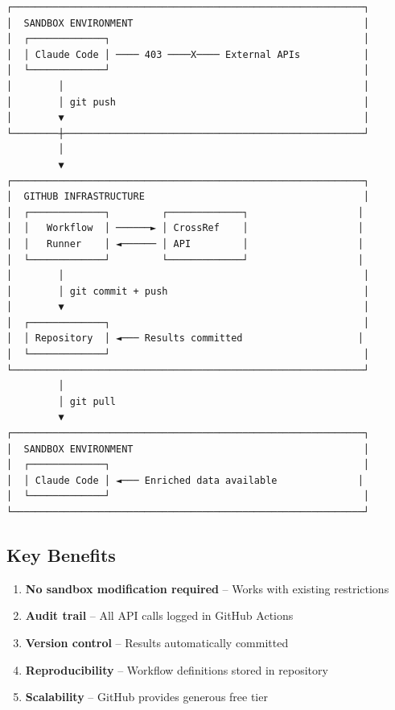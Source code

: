 \begin{verbatim}
┌─────────────────────────────────────────────────────────────┐
│  SANDBOX ENVIRONMENT                                        │
│  ┌─────────────┐                                            │
│  │ Claude Code │ ──── 403 ────X──── External APIs           │
│  └─────────────┘                                            │
│        │                                                    │
│        │ git push                                           │
│        ▼                                                    │
└────────┼────────────────────────────────────────────────────┘
         │
         ▼
┌─────────────────────────────────────────────────────────────┐
│  GITHUB INFRASTRUCTURE                                      │
│  ┌─────────────┐         ┌─────────────┐                   │
│  │   Workflow  │ ──────► │ CrossRef    │                   │
│  │   Runner    │ ◄────── │ API         │                   │
│  └─────────────┘         └─────────────┘                   │
│        │                                                    │
│        │ git commit + push                                  │
│        ▼                                                    │
│  ┌─────────────┐                                            │
│  │ Repository  │ ◄─── Results committed                    │
│  └─────────────┘                                            │
└─────────────────────────────────────────────────────────────┘
         │
         │ git pull
         ▼
┌─────────────────────────────────────────────────────────────┐
│  SANDBOX ENVIRONMENT                                        │
│  ┌─────────────┐                                            │
│  │ Claude Code │ ◄─── Enriched data available              │
│  └─────────────┘                                            │
└─────────────────────────────────────────────────────────────┘
\end{verbatim}

\subsection{Key Benefits}

\begin{enumerate}
    \item \textbf{No sandbox modification required} -- Works with existing restrictions
    \item \textbf{Audit trail} -- All API calls logged in GitHub Actions
    \item \textbf{Version control} -- Results automatically committed
    \item \textbf{Reproducibility} -- Workflow definitions stored in repository
    \item \textbf{Scalability} -- GitHub provides generous free tier
\end{enumerate}


